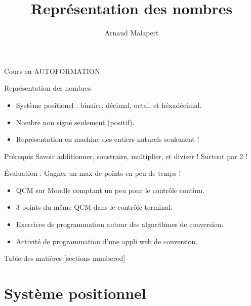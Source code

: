 \documentclass[10pt]{beamer}
\title{Représentation des nombres}
\author{Arnaud Malapert}
\begin{document}
\maketitle


\begin{frame}{Cours en AUTOFORMATION}
  
  \begin{block}{Représentation des nombres}
    \begin{itemize}
    \item Système positionel : binaire, décimal, octal, et héxadécimal.
    \item Nombre non signé seulement (positif).
    \item Représentation en machine des entiers naturels seulement !
    \end{itemize}
  \end{block}

  \begin{block}{Prérequis}
    Savoir additionner, soustraire, multiplier, et diviser ! Surtout par 2 !
  \end{block}

  \begin{alertblock}{Évaluation : Gagner un max de points en peu de temps !
}
    \begin{itemize}
    \item QCM sur Moodle comptant un peu pour le contrôle continu. 
    \item 3 points du même QCM dans le contrôle terminal.
    \item Exercices de programmation autour des algorithmes de conversion.
    \item Activité de programmation d'une appli web de conversion.
    \end{itemize}
  \end{alertblock}

\end{frame}


\begin{frame}{Table des matières}
  [sections numbered]
  \tableofcontents
\end{frame}


\section{Système positionnel}

\end{document}
